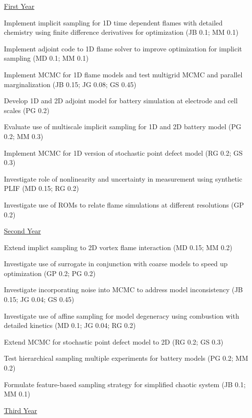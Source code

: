 \documentclass[11pt]{article}
\begin{document}
\underline{First Year}
\begin{compactitem}
\setlength{\itemsep}{0pt}\setlength{\parskip}{0pt}\setlength{\parsep}{0pt}
\item Implement implicit sampling for 1D time dependent flames with detailed chemistry using finite difference derivatives for optimization
(JB 0.1; MM 0.1)
\item Implement adjoint code to 1D flame solver to improve optimization for implicit sampling
(MD 0.1; MM 0.1)
\item Implement MCMC for 1D flame models and test multigrid MCMC and parallel marginalization
(JB 0.15; JG 0.08; GS 0.45)
\item Develop 1D and 2D adjoint model for battery simulation at electrode and cell scales
(PG 0.2)
\item Evaluate use of multiscale implicit sampling for 1D and 2D battery model
(PG 0.2; MM 0.3)
\item Implement MCMC for 1D version of stochastic point defect model
(RG 0.2; GS 0.3)
\item Investigate role of nonlinearity and uncertainty in measurement using synthetic PLIF
(MD 0.15; RG 0.2)
\item Investigate use of ROMs to relate flame simulations at different resolutions
(GP 0.2)
\end{compactitem}
%
\underline{Second Year}
\begin{compactitem}
\setlength{\itemsep}{0pt}\setlength{\parskip}{0pt}\setlength{\parsep}{0pt}
\item Extend implict sampling to 2D vortex flame interaction
(MD 0.15; MM 0.2)
\item Investigate use of surrogate in conjunction with coarse models to speed up optimization
(GP 0.2; PG 0.2)
\item Investigate incorporating noise into MCMC to address model inconsistency
(JB 0.15; JG 0.04; GS 0.45)
\item Investigate use of affine sampling for model degeneracy using combustion with detailed kinetics
(MD 0.1; JG 0.04; RG 0.2)
\item Extend MCMC for stochastic point defect model to 2D
(RG 0.2; GS 0.3)
\item Test hierarchical sampling multiple experiments for battery models
(PG 0.2; MM 0.2)
\item Formulate feature-based sampling strategy for simplified chaotic system
(JB 0.1; MM 0.1)
\end{compactitem}
%
\underline{Third Year}
\end{document}
